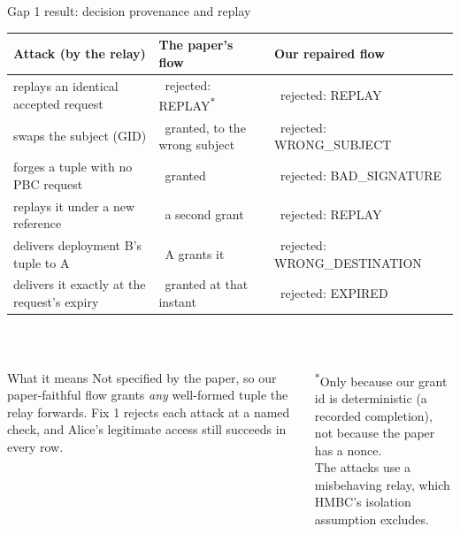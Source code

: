 \documentclass[aspectratio=169,10pt]{beamer}
\newcommand{\cmark}{\textcolor{okgreen}{\ding{51}}}
\newcommand{\xmark}{\textcolor{badred!80}{\ding{55}}}
\newcommand{\code}[1]{{\ttfamily\scriptsize #1}}
\begin{document}
\begin{frame}{Gap 1 result: decision provenance and replay}
\footnotesize
\renewcommand{\arraystretch}{1.3}
\begin{tabular}{@{}L{0.33\textwidth} L{0.30\textwidth} L{0.33\textwidth}@{}}
\toprule
\textbf{Attack (by the relay)} & \textbf{The paper's flow} & \textbf{Our repaired flow} \\
\midrule
replays an identical accepted request & \cmark\ rejected: \code{REPLAY}\textsuperscript{$*$} & \cmark\ rejected: \code{REPLAY} \\
swaps the subject (GID) & \xmark\ granted, to the wrong subject & \cmark\ rejected: \code{WRONG\_SUBJECT} \\
forges a tuple with no PBC request & \xmark\ granted & \cmark\ rejected: \code{BAD\_SIGNATURE} \\
replays it under a new reference & \xmark\ a second grant & \cmark\ rejected: \code{REPLAY} \\
delivers deployment B's tuple to A & \xmark\ A grants it & \cmark\ rejected: \code{WRONG\_DESTINATION} \\
delivers it exactly at the request's expiry & \xmark\ granted at that instant & \cmark\ rejected: \code{EXPIRED} \\
\bottomrule
\end{tabular}\\[0.15em]

\vspace{0.4em}
\begin{columns}[T,onlytextwidth]
\begin{alertblock}{What it means}
\scriptsize Not specified by the paper, so our paper-faithful flow grants \emph{any} well-formed tuple the relay forwards. Fix 1 rejects each attack at a named check, and Alice's legitimate access still succeeds in every row.
\end{alertblock}
\scriptsize\color{datagray}
\textsuperscript{$*$}Only because our grant id is deterministic (a recorded completion), not because the paper has a nonce.\\[3pt]
The attacks use a misbehaving relay, which HMBC's isolation assumption excludes.\\[3pt]
\end{columns}
\end{frame}
\end{document}
